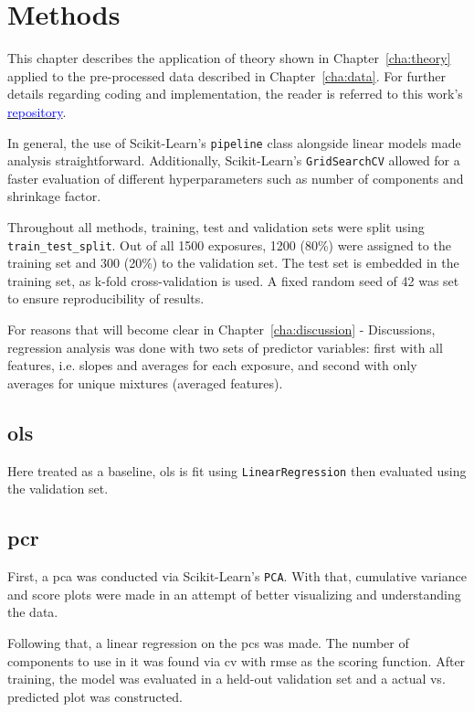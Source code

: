 \chapter{Methods}
\label{cha:methods}

This chapter describes the application of theory shown in Chapter~\ref{cha:theory} applied to the pre-processed data described in Chapter~\ref{cha:data}. For further details regarding coding and implementation, the reader is referred to this work's \href{https://github.com/cosmourao/thesis}{\textcolor{blue}{repository}}.

In general, the use of Scikit-Learn's \texttt{pipeline} class alongside linear models made analysis straightforward. Additionally, Scikit-Learn's \texttt{GridSearchCV} allowed for a faster evaluation of different hyperparameters such as number of components and shrinkage factor.

Throughout all methods, training, test and validation sets were split using \texttt{train\_test\_split}. Out of all 1500 exposures, 1200 (80\%) were assigned to the training set and 300 (20\%) to the validation set. The test set is embedded in the training set, as k-fold cross-validation is used. A fixed random seed of 42 was set to ensure reproducibility of results. 

For reasons that will become clear in Chapter~\ref{cha:discussion} - Discussions, regression analysis was done with two sets of predictor variables: first with all features, i.e. slopes and averages for each exposure, and second with only averages for unique mixtures (averaged features).

\section{\acrlong{ols}}
\label{sec:met-ols}

Here treated as a baseline, \acrshort{ols} is fit using \texttt{LinearRegression} then evaluated using the validation set.

\section{\acrlong{pcr}}
\label{sec:met-pcr}

First, a \acrshort{pca} was conducted via Scikit-Learn's \texttt{PCA}. With that, cumulative variance and score plots were made in an attempt of better visualizing and understanding the data.

Following that, a linear regression on the \acrshort{pc}s was made. The number of components to use in it was found via \acrshort{cv} with \acrshort{rmse} as the scoring function. After training, the model was evaluated in a held-out validation set and a actual vs. predicted plot was constructed.

